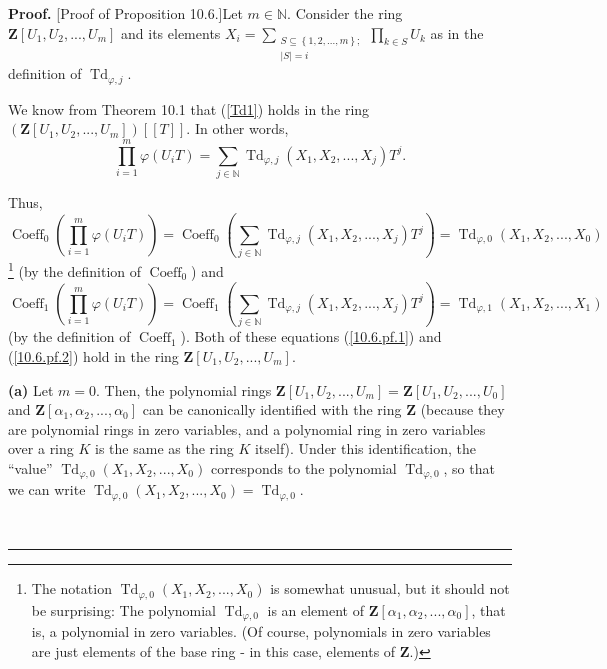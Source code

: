 \documentclass[numbers=enddot,12pt,final,onecolumn,notitlepage]{scrartcl}%
\newenvironment{proof}[1][Proof]{\noindent\textbf{#1.} }{\ \rule{0.5em}{0.5em}}
\begin{document}
\begin{proof}
[Proof of Proposition 10.6.]Let $m\in\mathbb{N}$. Consider the ring
$\mathbf{Z}\left[  U_{1},U_{2},...,U_{m}\right]  $ and its elements
$X_{i}=\sum\limits_{\substack{S\subseteq\left\{  1,2,...,m\right\}
;\\\left\vert S\right\vert =i}}\prod\limits_{k\in S}U_{k}$ as in the
definition of $\operatorname*{Td}\nolimits_{\varphi,j}$.

We know from Theorem 10.1 that (\ref{Td1}) holds in the ring $\left(
\mathbf{Z}\left[  U_{1},U_{2},...,U_{m}\right]  \right)  \left[  \left[
T\right]  \right]  $. In other words,%
\[
\prod\limits_{i=1}^{m}\varphi\left(  U_{i}T\right)  =\sum_{j\in\mathbb{N}%
}\operatorname*{Td}\nolimits_{\varphi,j}\left(  X_{1},X_{2},...,X_{j}\right)
T^{j}.
\]


Thus,
\begin{equation}
\operatorname*{Coeff}\nolimits_{0}\left(  \prod\limits_{i=1}^{m}\varphi\left(
U_{i}T\right)  \right)  =\operatorname*{Coeff}\nolimits_{0}\left(
\sum\limits_{j\in\mathbb{N}}\operatorname*{Td}\nolimits_{\varphi,j}\left(
X_{1},X_{2},...,X_{j}\right)  T^{j}\right)  =\operatorname*{Td}%
\nolimits_{\varphi,0}\left(  X_{1},X_{2},...,X_{0}\right)  \label{10.6.pf.1}%
\end{equation}
\footnote{The notation $\operatorname*{Td}\nolimits_{\varphi,0}\left(
X_{1},X_{2},...,X_{0}\right)  $ is somewhat unusual, but it should not be
surprising: The polynomial $\operatorname*{Td}\nolimits_{\varphi,0}$ is an
element of $\mathbf{Z}\left[  \alpha_{1},\alpha_{2},...,\alpha_{0}\right]  $,
that is, a polynomial in zero variables. (Of course, polynomials in zero
variables are just elements of the base ring - in this case, elements of
$\mathbf{Z}$.)} (by the definition of $\operatorname*{Coeff}\nolimits_{0}$)
and%
\begin{equation}
\operatorname*{Coeff}\nolimits_{1}\left(  \prod\limits_{i=1}^{m}\varphi\left(
U_{i}T\right)  \right)  =\operatorname*{Coeff}\nolimits_{1}\left(
\sum\limits_{j\in\mathbb{N}}\operatorname*{Td}\nolimits_{\varphi,j}\left(
X_{1},X_{2},...,X_{j}\right)  T^{j}\right)  =\operatorname*{Td}%
\nolimits_{\varphi,1}\left(  X_{1},X_{2},...,X_{1}\right)  \label{10.6.pf.2}%
\end{equation}
(by the definition of $\operatorname*{Coeff}\nolimits_{1}$). Both of these
equations (\ref{10.6.pf.1}) and (\ref{10.6.pf.2}) hold in the ring
$\mathbf{Z}\left[  U_{1},U_{2},...,U_{m}\right]  $.

\textbf{(a)} Let $m=0$. Then, the polynomial rings $\mathbf{Z}\left[
U_{1},U_{2},...,U_{m}\right]  =\mathbf{Z}\left[  U_{1},U_{2},...,U_{0}\right]
$ and $\mathbf{Z}\left[  \alpha_{1},\alpha_{2},...,\alpha_{0}\right]  $ can be
canonically identified with the ring $\mathbf{Z}$ (because they are polynomial
rings in zero variables, and a polynomial ring in zero variables over a ring
$K$ is the same as the ring $K$ itself). Under this identification, the
``value'' $\operatorname*{Td}\nolimits_{\varphi,0}\left(  X_{1},X_{2}%
,...,X_{0}\right)  $ corresponds to the polynomial $\operatorname*{Td}%
\nolimits_{\varphi,0}$, so that we can write $\operatorname*{Td}%
\nolimits_{\varphi,0}\left(  X_{1},X_{2},...,X_{0}\right)  =\operatorname*{Td}%
\nolimits_{\varphi,0}$.


\end{proof}
\end{document}
